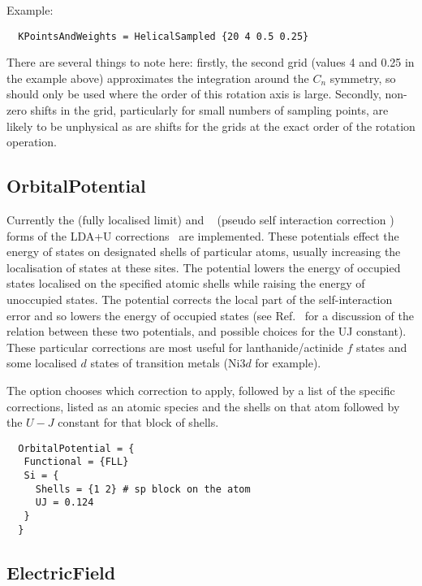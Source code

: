 Example:
\invparskip
\begin{verbatim}
  KPointsAndWeights = HelicalSampled {20 4 0.5 0.25}
\end{verbatim}

There are several things to note here: firstly, the second grid (values 4 and
0.25 in the example above) approximates the integration around the $C_n$
symmetry, so should only be used where the order of this rotation axis is
large. Secondly, non-zero shifts in the grid, particularly for small numbers of
sampling points, are likely to be unphysical as are shifts for the grids at the
exact order of the rotation operation.

\subsection{OrbitalPotential}
\label{sec:dftbp.OrbitalPotential}

\label{sec:DFTB+U}

Currently the  (fully localised limit) and
~\cite{hourahine07} (pseudo self interaction correction )
forms of the LDA+U corrections~\cite{petukhov-PRB-67-153106} are
implemented. These potentials effect the energy of states on
designated shells of particular atoms, usually increasing the
localisation of states at these sites. The  potential lowers
the energy of occupied states localised on the specified atomic shells
while raising the energy of unoccupied states. The 
potential corrects the local part of the self-interaction error and so
lowers the energy of occupied states (see Ref.~\cite{hourahine07} for
a discussion of the relation between these two potentials, and
possible choices for the UJ constant).  These particular corrections
are most useful for lanthanide/actinide $f$ states and some localised
$d$ states of transition metals (Ni$3d$ for example).

The  option chooses which correction to apply, followed
by a list of the specific corrections, listed as an atomic species and
the shells on that atom followed by the $U-J$ constant for that block
of shells.

\begin{verbatim}
  OrbitalPotential = {
   Functional = {FLL}
   Si = {
     Shells = {1 2} # sp block on the atom
     UJ = 0.124
   }
  }
\end{verbatim}

\subsection{ElectricField}
\label{sec:dftbp.ElectricField}

